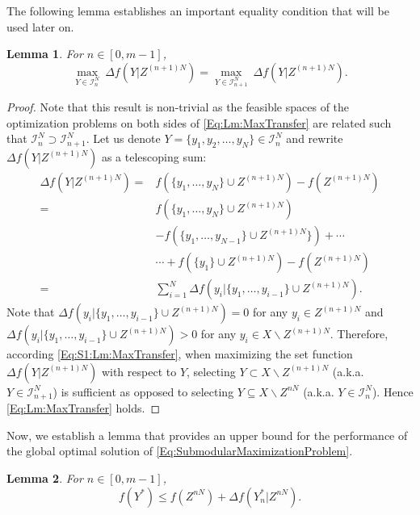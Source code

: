 \documentclass[conference]{IEEEtran}
\newtheorem{lemma}{Lemma}
\begin{document}
The following lemma establishes an important equality condition that will be used later on. 
\begin{lemma}\label{Lm:MaxTransfer}
For $n\in [0,m-1]$,
\begin{equation} \label{Eq:Lm:MaxTransfer}
\underset{Y\in\mathcal{I}^N_n}{\max}\ \Delta f(Y\vert Z^{(n+1)N}) = \underset{Y\in\mathcal{I}^N_{n+1}}{\max}\ \Delta f(Y\vert Z^{(n+1)N}).    
\end{equation}
\end{lemma}
\begin{proof}
Note that this result is non-trivial as the feasible spaces of the optimization problems on both sides of \eqref{Eq:Lm:MaxTransfer} are related such that $\mathcal{I}^N_n \supset \mathcal{I}^N_{n+1}$. Let us denote $Y=\{y_1,y_2,\ldots,y_N\}\in \mathcal{I}^N_{n}$ and rewrite $\Delta f(Y\vert Z^{(n+1)N})$ as a telescoping sum:
\begin{align}
    \Delta f(Y\vert Z^{(n+1)N})
    =& f(\{y_1,\ldots,y_N\} \cup Z^{(n+1)N}) - f(Z^{(n+1)N}) \nonumber \\
    =& f(\{y_1,\ldots,y_N\} \cup Z^{(n+1)N}) \nonumber \\
    &- f(\{y_1,\ldots,y_{N-1}\} \cup Z^{(n+1)N}\})+\cdots       \nonumber \\
    &\cdots + f(\{y_1\} \cup Z^{(n+1)N}) - f(Z^{(n+1)N}) \nonumber \\
    =& \sum_{i=1}^N \Delta f(y_i\vert \{y_1,\ldots,y_{i-1}\} \cup Z^{(n+1)N}).\label{Eq:S1:Lm:MaxTransfer}
\end{align}
Note that $\Delta f(y_i\vert \{y_1,\ldots,y_{i-1}\} \cup Z^{(n+1)N}) = 0$ for any $y_i \in Z^{(n+1)N}$ and $\Delta f(y_i\vert \{y_1,\ldots,y_{i-1}\} \cup Z^{(n+1)N}) > 0$ for any $y_i\in X\backslash Z^{(n+1)N}$. Therefore, according \eqref{Eq:S1:Lm:MaxTransfer}, when maximizing the set function $\Delta f(Y\vert Z^{(n+1)N})$ with respect to $Y$, selecting $Y \subset X\backslash Z^{(n+1)N}$ (a.k.a. $Y\in \mathcal{I}^N_{n+1}$) is sufficient as opposed to selecting $Y\subseteq X\backslash Z^{nN}$ (a.k.a. $Y\in\mathcal{I}^N_n$). Hence \eqref{Eq:Lm:MaxTransfer} holds.
\end{proof}

Now, we establish a lemma that provides an upper bound for the performance of the global optimal solution of \eqref{Eq:SubmodularMaximizationProblem}.




\begin{lemma}\label{Lm:UpperBoundForfYStar}
For $n\in[0,m-1]$,
\begin{equation}\label{Eq:Lm:UpperBoundForfYStar}
f(Y^*) \leq f(Z^{nN}) + \Delta f(Y^*_n \vert Z^{nN}).    
\end{equation}
\end{lemma}
\end{document}
